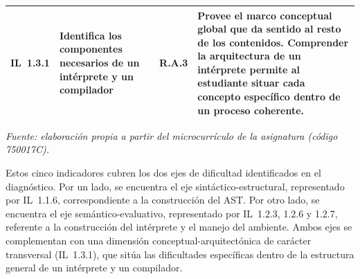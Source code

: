 \begin{table}[H]
\begin{tabular}{
>{\centering\arraybackslash}p{1.5cm}
>{\raggedright\arraybackslash}p{3.8cm}
>{\centering\arraybackslash}p{1cm}
>{\raggedright\arraybackslash}p{7cm}
}
\textbf{IL~1.3.1} &
Identifica los componentes necesarios de un intérprete y un compilador &
R.A.3 &
Provee el marco conceptual global que da sentido al resto de los contenidos. Comprender la arquitectura de un intérprete permite al estudiante situar cada concepto específico dentro de un proceso coherente. \\
\hline

\end{tabular}

\vskip 4pt
\footnotesize\textit{Fuente: elaboración propia a partir del microcurrículo de la asignatura (código 750017C).}
\end{table}

\FloatBarrier

Estos cinco indicadores cubren los dos ejes de dificultad identificados en el diagnóstico. Por un lado, se encuentra el eje sintáctico-estructural, representado por IL~1.1.6, correspondiente a la construcción del AST. Por otro lado, se encuentra el eje semántico-evaluativo, representado por IL~1.2.3, 1.2.6 y 1.2.7, referente a la construcción del intérprete y el manejo del ambiente. Ambos ejes se complementan con una dimensión conceptual-arquitectónica de carácter transversal (IL~1.3.1), que sitúa las dificultades específicas dentro de la estructura general de un intérprete y un compilador.
